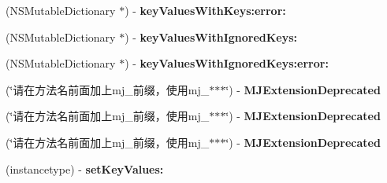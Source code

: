 \begin{DoxyCompactItemize}
\mbox{\label{category_n_s_object_07_m_j_key_value_deprecated__v__2__5__16_08_aebebaad332e5b843cc3d568d9762a4e3}} 
(N\+S\+Mutable\+Dictionary $\ast$) -\/ {\bfseries key\+Values\+With\+Keys\+:error\+:}
\item 
\mbox{\label{category_n_s_object_07_m_j_key_value_deprecated__v__2__5__16_08_a9d5308ad2c7c0fa8f88adf9f119bbd08}} 
(N\+S\+Mutable\+Dictionary $\ast$) -\/ {\bfseries key\+Values\+With\+Ignored\+Keys\+:}
\item 
\mbox{\label{category_n_s_object_07_m_j_key_value_deprecated__v__2__5__16_08_ae0e5463129276db571a607b326b1f440}} 
(N\+S\+Mutable\+Dictionary $\ast$) -\/ {\bfseries key\+Values\+With\+Ignored\+Keys\+:error\+:}
\item 
\mbox{\label{category_n_s_object_07_m_j_key_value_deprecated__v__2__5__16_08_a6da7166fe843e9d1c5173a744acbbb3f}} 
(\char`\"{}请在方法名前面加上mj\+\_\+前缀，使用mj\+\_\+$\ast$$\ast$$\ast$\char`\"{}) -\/ {\bfseries M\+J\+Extension\+Deprecated}
\item 
\mbox{\label{category_n_s_object_07_m_j_key_value_deprecated__v__2__5__16_08_a6da7166fe843e9d1c5173a744acbbb3f}} 
(\char`\"{}请在方法名前面加上mj\+\_\+前缀，使用mj\+\_\+$\ast$$\ast$$\ast$\char`\"{}) -\/ {\bfseries M\+J\+Extension\+Deprecated}
\item 
\mbox{\label{category_n_s_object_07_m_j_key_value_deprecated__v__2__5__16_08_a6da7166fe843e9d1c5173a744acbbb3f}} 
(\char`\"{}请在方法名前面加上mj\+\_\+前缀，使用mj\+\_\+$\ast$$\ast$$\ast$\char`\"{}) -\/ {\bfseries M\+J\+Extension\+Deprecated}
\item 
\mbox{\label{category_n_s_object_07_m_j_key_value_deprecated__v__2__5__16_08_aa1e138aa5532c51815221a7d3cfc8e79}} 
(instancetype) -\/ {\bfseries set\+Key\+Values\+:}
\item 

\end{DoxyCompactItemize}
